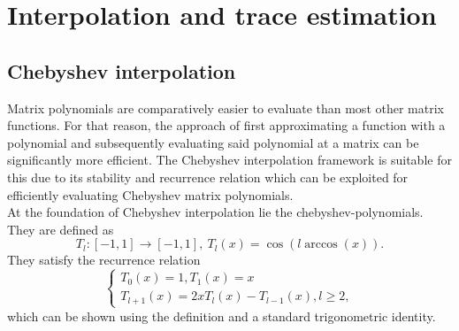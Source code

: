 \chapter{Interpolation and trace estimation}
\label{chp:2-chebyshev}



\section{Chebyshev interpolation}
\label{sec:2-chebyshev-interpolation}

Matrix polynomials are comparatively easier to evaluate than most other
matrix functions. For that reason, the approach of first approximating
a function with a polynomial and subsequently evaluating said polynomial at a
matrix can be significantly more efficient.
The Chebyshev interpolation framework is suitable for this due to its stability
and recurrence relation  which can
be exploited for efficiently evaluating Chebyshev matrix polynomials.\\

At the foundation of Chebyshev interpolation lie the \glspl{chebyshev-polynomial}.
They are defined as \cite[Chapter~3]{trefethen2019chebyshev}
\begin{equation}
    T_l: [-1, 1] \to [-1, 1],~T_l(x) = \cos(l \arccos(x)).
    \label{equ:2-chebyshev-chebyshev-definition}
\end{equation}
They satisfy the recurrence relation
\begin{equation}
    \begin{cases}
        T_0(x) = 1, T_1(x) = x \\ T_{l+1}(x) = 2x T_l(x) - T_{l-1}(x), l \geq 2,
    \end{cases}
    \label{equ:2-chebyshev-chebyshev-recursion}
\end{equation}
which can be shown using the definition 
and a standard trigonometric identity.\\

